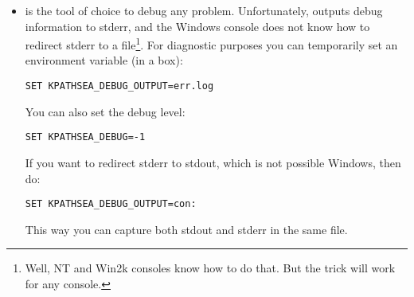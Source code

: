 \documentclass{article}
\begin{document}
\begin{itemize}

\item {} is the tool of choice to debug any
problem.  Unfortunately,  outputs debug information
to stderr, and the Windows console does not know how to redirect stderr
to a file\footnote{Well, NT and Win2k consoles know how to do that. But
the trick will work for any console.}.  For diagnostic purposes you can
temporarily set an environment variable (in a  box):

\begin{verbatim}
SET KPATHSEA_DEBUG_OUTPUT=err.log
\end{verbatim}
You can also set the debug level: 
\begin{verbatim}
SET KPATHSEA_DEBUG=-1
\end{verbatim}

If you want to redirect stderr to stdout, which is not possible 
Windows, then do:
\begin{verbatim}
SET KPATHSEA_DEBUG_OUTPUT=con:
\end{verbatim}
This way you can capture both stdout and stderr in the same file.


\end{itemize}
\end{document}
